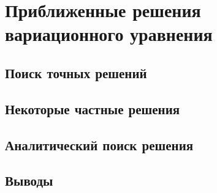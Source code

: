 
\chapter{Приближенные решения вариационного уравнения}\label{ch-solution}

\section{Поиск точных решений}\label{sec-exact}

\section{Некоторые частные решения}\label{sec-part}

\section{Аналитический поиск решения}\label{sec-analyt}

\section{Выводы}\label{sec-soloutro}